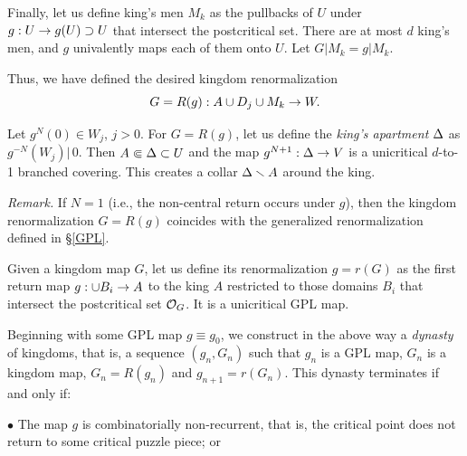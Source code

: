 
Finally, let us define  king's men $M_k$ 
as the pullbacks of $U$ under  $g: U\rightarrow g(U)\supset U$ that intersect the postcritical set.
There are at most $d$ king's men, and $g$ univalently maps each of them onto $U$. 
Let $G|M_k= g|M_k$. 

Thus, we have defined the desired kingdom renormalization 
$$
   G=R(g) : A \cup D_j\cup M_k \rightarrow W.
$$ 

Let $g^N(0)\in W_j$, $j>0$. For $G=R(g)$,  
let us define the {\it king's apartment} ${\Delta}$ as $g^{-N}(W_j)|\, 0$. 
Then $A\Subset {\Delta}\subset U$
and the map $g^{N+1} : {\Delta}\rightarrow V$ is a unicritical $d$-to-1 branched covering. 
This creates a collar ${\Delta}\smallsetminus A$ around the king.  

\ssk
{\it Remark.} If $N=1$ (i.e., the non-central return occurs under $g$), then the kingdom renormalization
$G=R(g)$ coincides with the generalized renormalization defined in \S \ref{GPL}. 


\msk
 Given a kingdom map $G$, let us define its renormalization $g=r(G)$ as the first return map
$g: \cup B_i\rightarrow A$  to the king $A$ restricted to those domains $B_i$ that  intersect the postcritical set ${\cal O}_G$. 
It is a unicritical GPL map.


Beginning with some GPL map $g\equiv g_0$, 
we construct in the above way  a {\it dynasty} of kingdoms, that is, 
 a sequence  $(g_n, G_n)$ such that $g_n$ is a GPL map, $G_n$ is a kingdom map,
$G_n= R(g_n)$ and $g_{n+1} = r(G_n)$. This dynasty terminates if and only if:

\ssk\nin $\bullet$ The map $g$ is combinatorially non-recurrent, that is, 
   the critical point does not return to some critical puzzle piece; or 

